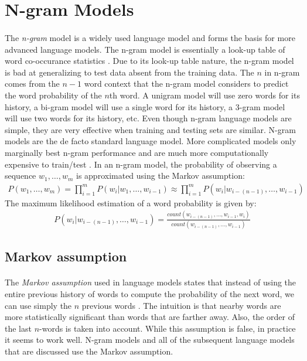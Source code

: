 \section{N-gram Models}
\paragraph{}
The \emph{n-gram} model is a widely used language model and forms the basis for more advanced language models. The n-gram model is essentially a look-up table of word co-occurance statistics \cite{Jurafsky2009}. Due to its look-up table nature, the n-gram model is bad at generalizing to test data absent from the training data. The $n$ in n-gram comes from the $n -1$ word context that the n-gram model considers to predict the word probability of the $n$th word. A unigram model will use zero words for its history, a bi-gram model will use a single word for its history, a 3-gram model will use two words for its history, etc.  Even though n-gram language models are simple, they are very effective when training and testing sets are similar. N-gram models are the de facto standard language model. More complicated models only marginally best n-gram performance and are much more computationally expensive to train/test \cite{Mikolov2012}. 
In an n-gram model, the probability of observing a sequence $w_1, \dots, w_m$ is approximated using the Markov assumption:
\begin{align}
P(w_1,\dots,w_m) = \prod^{m}_{i=1} P(w_i|w_1,\dots, w_{i-1}) \approx  \prod^{m}_{i=1} P(w_i | w_{i-(n-1)},\dots, w_{i-1}) 
\end{align}
The maximum likelihood estimation of a word probability is given by:
\begin{align}
P(w_i | w_{i-(n-1)},\dots, w_{i-1}) = \frac{count(w_{i-(n-1)},\dots,w_{i-1},w_i)}{count(w_{i-(n-1)},\dots,w_{i-1})} 
\end{align}

\subsection{Markov assumption}
\paragraph{}
The \emph{Markov assumption} used in language models states that instead of using the entire previous history of words to compute the probability of the next word, we can use simply the $n$ previous words \cite{Jurafsky2009}. The intuition is that nearby words are more statistically significant than words that are farther away. Also, the order of the last $n$-words is taken into account. While this assumption is false, in practice it seems to work well. N-gram models and all of the subsequent language models that are discussed use the Markov assumption.
